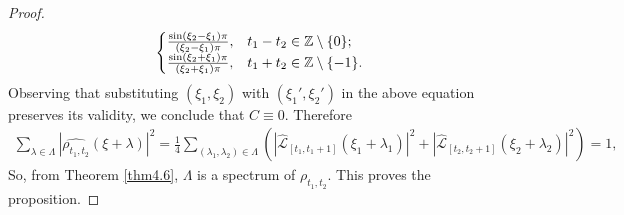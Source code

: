 \documentclass[12pt,psfig,reqno]{amsart}
\numberwithin{equation}{section}
\theoremstyle{plain}
\begin{document}
\begin{proof}
$$\begin{cases}
		\frac{\sin(\xi_2-\xi_1)\pi}{(\xi_2-\xi_1)\pi}, & t_1-t_2\in\Bbb Z\setminus\{0\};
		\\
		\frac{\sin(\xi_2+\xi_1)\pi}{(\xi_2+\xi_1)\pi}, & t_1+t_2\in\Bbb Z\setminus\{-1\}.
	\end{cases}
$$
Observing that substituting $(\xi_1,\xi_2)$ with $(\xi_1',\xi_2')$ in the above equation preserves its validity, we conclude that $C\equiv0$.
Therefore 
	\begin{align*}
	\sum_{\lambda\in\Lambda}|\widehat{\rho_{t_1,t_2}}(\xi+\lambda)|^2=\frac14\sum_{(\lambda_1,\lambda_2)\in\Lambda}(|\widehat{\mathcal{L}}_{[t_1,t_1+1]}(\xi_1+\lambda_1)|^2+|\widehat{\mathcal{L}}_{[t_2,t_2+1]}(\xi_2+\lambda_2)|^2)=1,
\end{align*}
	So, from Theorem \ref{thm4.6}, $\Lambda$ is a spectrum of $\rho_{t_1,t_2}$. 
	This proves the proposition. 
\end{proof}
\end{document}
